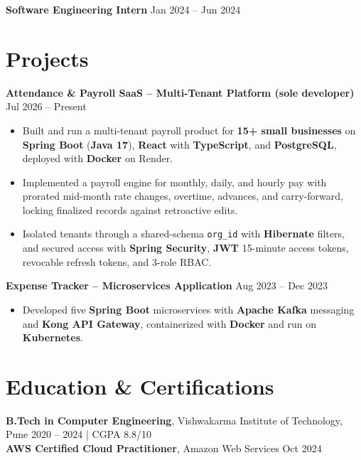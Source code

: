 \documentclass[a4paper,10pt]{article}
\begin{document}
\textbf{Software Engineering Intern} \hfill Jan 2024 -- Jun 2024

\section*{Projects}

\textbf{Attendance \& Payroll SaaS -- Multi-Tenant Platform (sole developer)} \hfill Jul 2026 -- Present
\begin{itemize}[leftmargin=*]
    \item Built and run a multi-tenant payroll product for \textbf{15+ small businesses} on \textbf{Spring Boot} (\textbf{Java 17}), \textbf{React} with \textbf{TypeScript}, and \textbf{PostgreSQL}, deployed with \textbf{Docker} on Render.
    \item Implemented a payroll engine for monthly, daily, and hourly pay with prorated mid-month rate changes, overtime, advances, and carry-forward, locking finalized records against retroactive edits.
    \item Isolated tenants through a shared-schema \texttt{org\_id} with \textbf{Hibernate} filters, and secured access with \textbf{Spring Security}, \textbf{JWT} 15-minute access tokens, revocable refresh tokens, and 3-role RBAC.
\end{itemize}

\textbf{Expense Tracker -- Microservices Application} \hfill Aug 2023 -- Dec 2023
\begin{itemize}[leftmargin=*]
    \item Developed five \textbf{Spring Boot} microservices with \textbf{Apache Kafka} messaging and \textbf{Kong API Gateway}, containerized with \textbf{Docker} and run on \textbf{Kubernetes}.
\end{itemize}

\section*{Education \& Certifications}
\textbf{B.Tech in Computer Engineering}, Vishwakarma Institute of Technology, Pune \hfill 2020 -- 2024 \;|\; CGPA 8.8/10 \\
\textbf{AWS Certified Cloud Practitioner}, Amazon Web Services \hfill Oct 2024
\end{document}
